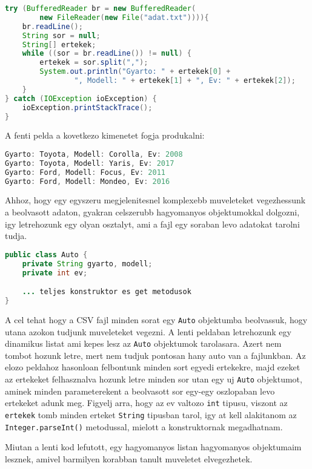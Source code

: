 \documentclass{article}
\let\l\lstinline
\begin{document}
\newpage

\begin{lstlisting}[language=Java, caption=Sorok betoltese tombkent]
try (BufferedReader br = new BufferedReader(
        new FileReader(new File("adat.txt")))){
    br.readLine();
    String sor = null;
    String[] ertekek;
    while ((sor = br.readLine()) != null) {
        ertekek = sor.split(",");
        System.out.println("Gyarto: " + ertekek[0] +
                ", Modell: " + ertekek[1] + ", Ev: " + ertekek[2]);
    }
} catch (IOException ioException) {
    ioException.printStackTrace();
}
\end{lstlisting}

A fenti pelda a kovetkezo kimenetet fogja produkalni:

\begin{lstlisting}[language=Java, caption=Kimenet]
Gyarto: Toyota, Modell: Corolla, Ev: 2008
Gyarto: Toyota, Modell: Yaris, Ev: 2017
Gyarto: Ford, Modell: Focus, Ev: 2011
Gyarto: Ford, Modell: Mondeo, Ev: 2016
\end{lstlisting}

Ahhoz, hogy egy egyszeru megjelenitesnel komplexebb muveleteket vegezhessunk a beolvasott adaton, gyakran celszerubb hagyomanyos objektumokkal dolgozni, igy letrehozunk egy olyan osztalyt, ami a fajl egy soraban levo adatokat tarolni tudja.

\begin{lstlisting}[language=Java, caption=Auto osztaly]
public class Auto {
    private String gyarto, modell;
    private int ev;

    ... teljes konstruktor es get metodusok
}
\end{lstlisting}

A cel tehat hogy a CSV fajl minden sorat egy \l{Auto} objektumba beolvassuk, hogy utana azokon tudjunk muveleteket vegezni. A lenti peldaban letrehozunk egy dinamikus listat ami kepes lesz az \l{Auto} objektumok tarolasara. Azert nem tombot hozunk letre, mert nem tudjuk pontosan hany auto van a fajlunkban. Az elozo peldahoz hasonloan felbontunk minden sort egyedi ertekekre, majd ezeket az ertekeket felhasznalva hozunk letre minden sor utan egy uj \l{Auto} objektumot, aminek minden parameterekent a beolvasott sor egy-egy oszlopaban levo ertekeket adunk meg. Figyelj arra, hogy az ev valtozo \l{int} tipusu, viszont az \l{ertekek} tomb minden erteket \l{String} tipusban tarol, igy at kell alakitanom az \l{Integer.parseInt()} metodussal, mielott a konstruktornak megadhatnam.

Miutan a lenti kod lefutott, egy hagyomanyos listan hagyomanyos objektumaim lesznek, amivel barmilyen korabban tanult muveletet elvegezhetek.
\end{document}
